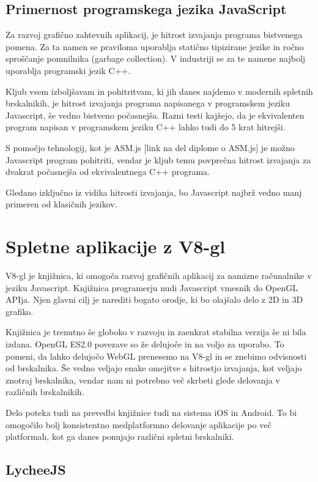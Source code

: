 \subsection{Primernost programskega jezika JavaScript}

Za razvoj grafično zahtevnih aplikacij, je hitrost izvajanja programa bistvenega pomena. Za ta namen se praviloma uporablja statično tipizirane jezike in ročno sproščanje pomnilnika (garbage collection). V industriji se za te namene najbolj uporablja programski jezik C++.

Kljub vsem izboljšavam in pohitritvam, ki jih danes najdemo v modernih spletnih brskalnikih, je hitrost izvajanja programa napisanega v programskem jeziku Javascript, še vedno bistveno počasnejša. Razni testi kajžejo, da je ekvivalenten program napisan v programskem jeziku C++ lahko tudi do 5 krat hitrejši.

S pomočjo tehnologij, kot je ASM.js [link na del diplome o ASM.js] je možno Javascript program pohitriti, vendar je kljub temu povprečna hitrost izvajanja za dvakrat počasnejša od ekvivalentnega C++ programa.

Gledano izključno iz vidika hitrosti izvajanja, bo Javascript najbrž vedno manj primeren od klasičnih jezikov.

\section{Spletne aplikacije z V8-gl}

V8-gl je knjižnica, ki omogoča razvoj grafičnih aplikacij za namizne računalnike v jeziku Javascript. Knjižnica programerju nudi Javascript vmesnik do OpenGL APIja. Njen glavni cilj je narediti bogato orodje, ki bo olajšalo delo z 2D in 3D grafiko.

Knjižnica je trenutno še globoko v razvoju in zaenkrat stabilna verzija še ni bila izdana. OpenGL ES2.0 povezave so že delujoče in na voljo za uporabo. To pomeni, da lahko delujočo WebGL prenesemo na V8-gl in se znebimo odvisnosti od brskalnika. Še vedno veljajo enake omejitve s hitrostjo izvajanja, kot veljajo znotraj brskalnika, vendar nam ni potrebno več skrbeti glede delovanja v različnih brskalnikih.

Delo poteka tudi na prevedbi knjižnice tudi na sistema iOS in Android. To bi omogočilo bolj konsistentno medplatformno delovanje aplikacije po več platformah, kot ga danes ponujajo različni spletni brskalniki.

\subsection{LycheeJS}

